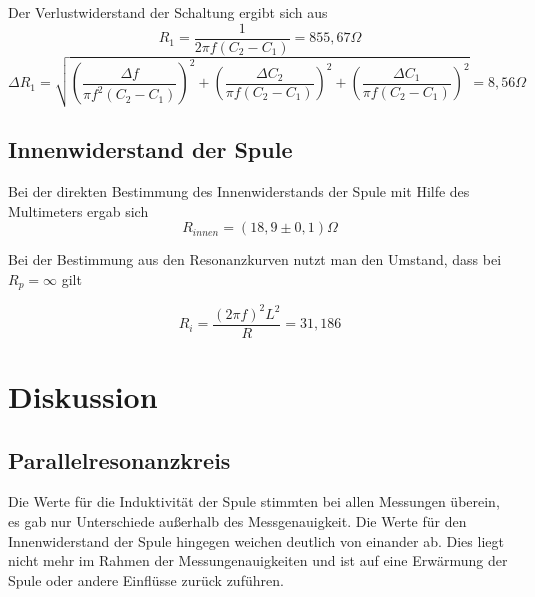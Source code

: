 Der Verlustwiderstand der Schaltung ergibt sich aus
\begin{equation}
R_1= \frac{1}{2\pi f (C_2-C_1)}=855,67\Omega
\end{equation}
\begin{equation}
\Delta R_1 = \sqrt{ \left( \dfrac{\Delta f}{\pi f^2 (C_2 - C_1)} \right)^2 + \left( \dfrac{\Delta C_2}{\pi f (C_2 - C_1)} \right)^2 + \left( \dfrac{\Delta C_1}{\pi f (C_2 - C_1)} \right)^2}=8,56\Omega
\end{equation}

\subsection{Innenwiderstand der Spule}

Bei der direkten Bestimmung des Innenwiderstands der Spule mit Hilfe des Multimeters ergab sich
\begin{equation}
R_{innen}=(18,9\pm0,1)\Omega
\end{equation}

Bei der Bestimmung aus den Resonanzkurven nutzt man den Umstand, dass bei $R_p = \infty$ gilt

\begin{equation}
R_i=\frac{(2\pi f)^2L^2}{R}=31,186
\end{equation}
\section{Diskussion}
\subsection{Parallelresonanzkreis}
Die Werte für die Induktivität der Spule stimmten bei allen Messungen überein, es gab nur Unterschiede außerhalb des Messgenauigkeit. Die Werte für den Innenwiderstand der Spule hingegen weichen deutlich von einander ab. Dies liegt nicht mehr im Rahmen der Messungenauigkeiten und ist auf eine Erwärmung der Spule oder andere Einflüsse zurück zuführen. 
